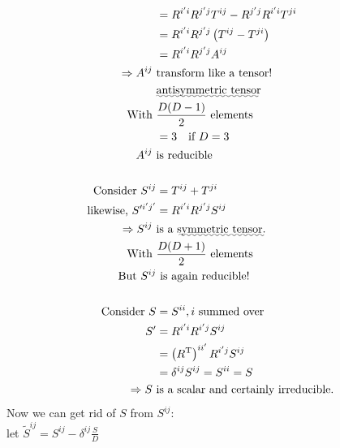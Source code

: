 \documentclass[11pt,fleqn]{book} %
\begin{document}
\begin{itemize}
\begin{align*}
                                 &= R^{i'i} R^{j'j} T^{ij} - R^{j'j} R^{i'i} T^{ji}    \\
                                 &= R^{i'i} R^{j'j} \left( T^{ij} - T^{ji} \right)     \\
                                 &= R^{i'i} R^{j'j} A^{ij}                             \\
    \Rightarrow A^{ij} \         & \text{transform like a tensor!}                     \\
                                 & \text{\uwave{antisymmetric tensor}}                 \\
    \text{With}\                 & \frac{D(D-1)}{2}\ \text{elements}                   \\
                                 &= 3 \quad \text{if}\ D = 3                           \\
    A^{ij} \                     & \text{is reducible}                                 \\ \\
    \text{Consider} \ S^{ij}     &= T^{ij} + T^{ji}                                    \\
    \text{likewise,} \ S'^{i'j'} &= R^{i'i} R^{j'j} S^{ij}                             \\
    \Rightarrow S^{ij} \         & \text{is a \uwave{symmetric tensor.}}               \\
    \text{With}\                 & \frac{D(D+1)}{2} \ \text{elements}                  \\
    \text{But}\ S^{ij}           & \ \text{is again reducible!}                        \\ \\
    \text{Consider}\ S           &= S^{ii}, i \ \text{summed over}                     \\
                         S'      &= R^{i'i} R^{i'j} S^{ij}                             \\
                                 &= \left( R^{\mathrm{T}} \right)^{ii'} R^{i'j} S^{ij} \\
                                 &= \delta^{ij} S^{ij} = S^{ii} = S                    \\
    \Rightarrow S \              & \text{is a scalar and certainly irreducible.}       \\
  \end{align*}
  Now we can get rid of \(S\) from \(S^{ij}\): \\
  let \(\tilde{S}^{ij} = S^{ij} - \delta^{ij} \frac{S}{D}\)

\end{itemize}
\end{document}
